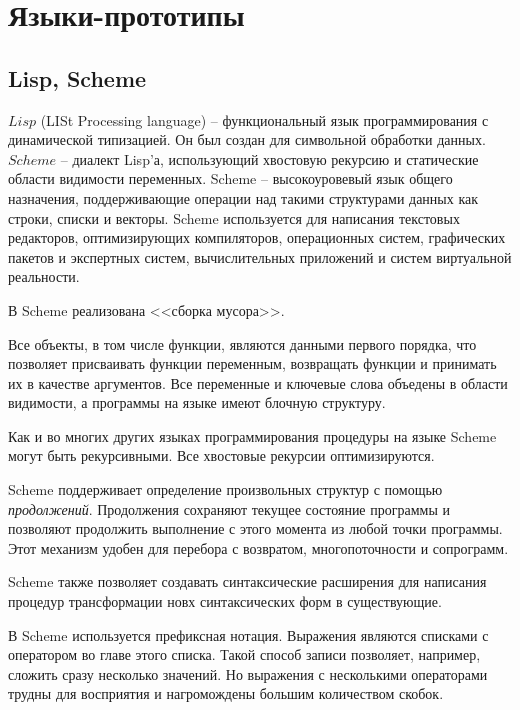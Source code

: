 \section{Языки-прототипы}
    \subsection{Lisp, Scheme}
        $Lisp$ (LISt Processing language) -- функциональный язык программирования с динамической типизацией. 
        Он был создан для символьной обработки данных.\cite{p_c_lisp}
        $Scheme$ -- диалект Lisp'а, использующий хвостовую рекурсию и статические области видимости переменных.\cite{scheme_doc}
        Scheme -- высокоуровевый язык общего назначения, поддерживающие операции над такими структурами данных как строки, списки и векторы.
        Scheme используется для написания текстовых редакторов, оптимизирующих компиляторов, операционных систем, графических пакетов и экспертных систем, вычислительных приложений и систем виртуальной реальности.
        
        В Scheme реализована <<сборка мусора>>.
        
        Все объекты, в том числе функции, являются данными первого порядка, что позволяет присваивать функции переменным, возвращать функции и принимать их в качестве аргументов.
        Все переменные и ключевые слова объедены в области видимости, а программы на языке имеют блочную структуру.
        
        Как и во многих других языках программирования процедуры на языке Scheme могут быть рекурсивными.
        Все хвостовые рекурсии оптимизируются.

        Scheme поддерживает определение произвольных структур с помощью \textit{продолжений}.
        Продолжения сохраняют текущее состояние программы и позволяют продолжить выполнение с этого момента из любой точки программы.
        Этот механизм удобен для перебора с возвратом, многопоточности и сопрограмм.

        Scheme также позволяет создавать синтаксические расширения для написания процедур трансформации новх синтаксических форм в существующие.\cite{scheme_pl}

        В Scheme используется префиксная нотация.
        Выражения являются списками с оператором во главе этого списка.
        Такой способ записи позволяет, например, сложить сразу несколько значений.
        Но выражения с несколькими операторами трудны для восприятия и нагромождены большим количеством скобок.

